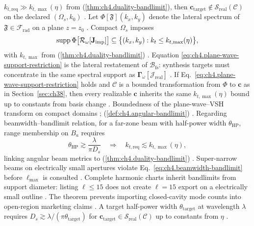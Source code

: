 \(k_{t,\mathrm{req}}\gg k_{t,\max}(\eta)\) from (\ref{thm:ch4.duality-bandlimit}), then
\(\mathbf{c}_{\mathrm{target}}\notin\mathcal{S}_{\mathrm{real}}(\mathcal{C})\) on the declared \((\Omega_{s},k_{0})\)
\cite{jackson1999}.
Let \(\Phi[\mathfrak{F}](k_{x},k_{y})\) denote the lateral spectrum of \(\mathfrak{F}\in\mathcal{F}_{\mathrm{rad}}\) on a
plane \(z=z_{0}\) \cite{stratton1941}. Compact \(\Omega_{s}\) imposes
\begin{equation}
\label{eq:ch4.plane-wave-support-restriction}
\operatorname{supp}\Phi\big[\mathcal{R}_\omega[\mathbf{J}_{\mathrm{imp}}]\big]
\subseteq
\big\{(k_{x},k_{y}):k_{t}\le k_{t,\max}(\eta)\big\},
\end{equation}
with \(k_{t,\max}\) from (\ref{thm:ch4.duality-bandlimit}) \cite{hansen1988}. Equation
\eqref{eq:ch4.plane-wave-support-restriction} is the lateral restatement of
\(\mathcal{B}_{\mathrm{fs}}\): synthesis targets must concentrate in the same spectral support as
\(\boldsymbol{\Gamma}_\omega[\mathcal{J}_{\mathrm{real}}]\) \cite{stratton1941}.
\label{thm:ch4.bandlimit-listing-continuity}
If Eq.~\eqref{eq:ch4.plane-wave-support-restriction} holds and \(\mathcal{C}\) is a bounded transformation from
\(\Phi\) to \(\mathbf{c}\) as in Section~\ref{sec:ch38}, then every realizable \(\mathbf{c}\) inherits the same
\(k_{t,\max}(\eta)\) bound up to constants from basis change \cite{hansen1988}.
Boundedness of the plane-wave--VSH transform on compact domains
\cite{hansen1988}; (\ref{def:ch4.angular-bandlimit}) \cite{devaney2004}.
Regarding beamwidth--bandlimit relation, for a far-zone beam with half-power width \(\theta_{\mathrm{HP}}\), range membership on \(B_{a}\) requires
\begin{equation}
\label{eq:ch4.beamwidth-bandlimit}
\theta_{\mathrm{HP}}
\gtrsim
\frac{\lambda}{\pi D_{s}}
\quad\Longrightarrow\quad
k_{t,\mathrm{req}}\lesssim k_{t,\max}(\eta),
\end{equation}
linking angular beam metrics to (\ref{thm:ch4.duality-bandlimit}) \cite{jackson1999}.
Super-narrow beams on electrically small apertures violate Eq.~\eqref{eq:ch4.beamwidth-bandlimit} before
\(\ell_{\max}\) is consulted \cite{devaney2004}.
Complete harmonic charts inherit bandlimits from support diameter: listing $\ell\le 15$ does not create $\ell=15$ export on a electrically small outline \cite{hansen1988}. The theorem prevents importing closed-cavity mode counts into open-region marketing claims \cite{jackson1999}.
\label{cor:ch4.min-aperture-beamwidth}
A target half-power width \(\theta_{\mathrm{target}}\) at wavelength \(\lambda\) requires
\(D_{s}\gtrsim\lambda/(\pi\theta_{\mathrm{target}})\) for \(\mathbf{c}_{\mathrm{target}}\in\mathcal{S}_{\mathrm{real}}(\mathcal{C})\)
up to constants from \(\eta\) \cite{jackson1999}.
